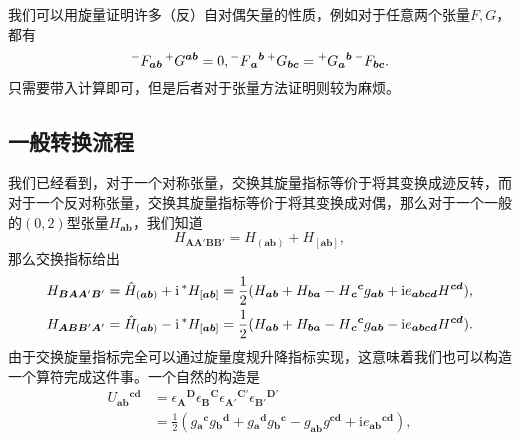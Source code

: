 我们可以用旋量证明许多（反）自对偶矢量的性质，例如对于任意两个张量$F,G$，都有
\begin{equation*}
	\prescript{-}{}{} F_{\boldsymbol{ab}}\prescript{+}{}{} G^{\boldsymbol{ab}} =0,\prescript{-}{}{} F{_{\boldsymbol{a}}}^{\boldsymbol{b}}\prescript{+}{}{} G_{\boldsymbol{bc}} =\prescript{+}{}{} G{_{\boldsymbol{a}}}^{\boldsymbol{b}}\prescript{-}{}{} F_{\boldsymbol{bc}} .
\end{equation*}
只需要带入计算即可，但是后者对于张量方法证明则较为麻烦。


\subsection{一般转换流程}

我们已经看到，对于一个对称张量，交换其旋量指标等价于将其变换成迹反转，而对于一个反对称张量，交换其旋量指标等价于将其变换成对偶，那么对于一个一般的$( 0,2)$型张量$H_{\boldsymbol{ab}}$，我们知道
\begin{equation*}
	H_{\boldsymbol{AA} '\boldsymbol{BB} '} =H_{(\boldsymbol{ab})} +H_{[\boldsymbol{ab}]} ,
\end{equation*}
那么交换指标给出
\begin{equation*}
	\begin{aligned}
		H_{\boldsymbol{BAA} '\boldsymbol{B} '} & =\hat{H}_{(\boldsymbol{ab})} +\mathrm{i}\prescript{*}{}{} H_{[\boldsymbol{ab}]} =\frac{1}{2} (H_{\boldsymbol{ab}} +H_{\boldsymbol{ba}} -H{_{\boldsymbol{c}}}^{\boldsymbol{c}} g_{\boldsymbol{ab}} +\mathrm{i} e_{\boldsymbol{abcd}} H^{\boldsymbol{cd}} ),\\
		H_{\boldsymbol{ABB} '\boldsymbol{A} '} & =\hat{H}_{(\boldsymbol{ab})} -\mathrm{i}\prescript{*}{}{} H_{[\boldsymbol{ab}]} =\frac{1}{2} (H_{\boldsymbol{ab}} +H_{\boldsymbol{ba}} -H{_{\boldsymbol{c}}}^{\boldsymbol{c}} g_{\boldsymbol{ab}} -\mathrm{i} e_{\boldsymbol{abcd}} H^{\boldsymbol{cd}} ).
	\end{aligned}
\end{equation*}
由于交换旋量指标完全可以通过旋量度规升降指标实现，这意味着我们也可以构造一个算符完成这件事。一个自然的构造是
\begin{equation*}
	\begin{aligned}
		U{_{\boldsymbol{ab}}}^{\boldsymbol{cd}} & =\epsilon {_{\boldsymbol{A}}}^{\boldsymbol{D}} \epsilon {_{\boldsymbol{B}}}^{\boldsymbol{C}} \epsilon {_{\boldsymbol{A} '}}^{\boldsymbol{C} '} \epsilon {_{\boldsymbol{B} '}}^{\boldsymbol{D} '}\\
		& =\frac{1}{2} (g{_{\boldsymbol{a}}}^{\boldsymbol{c}} g{_{\boldsymbol{b}}}^{\boldsymbol{d}} +g{_{\boldsymbol{a}}}^{\boldsymbol{d}} g{_{\boldsymbol{b}}}^{\boldsymbol{c}} -g_{\boldsymbol{ab}} g^{\boldsymbol{cd}} +\mathrm{i} e{_{\boldsymbol{ab}}}^{\boldsymbol{cd}} ),
	\end{aligned}
\end{equation*}
